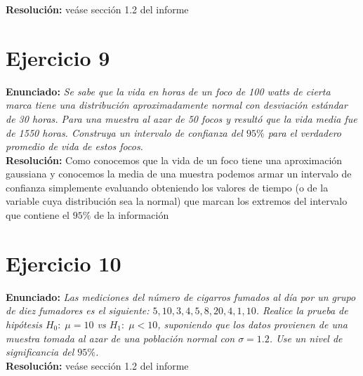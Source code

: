 \documentclass[twocolumn]{article}
\begin{document}
\textbf{Resolución:} veáse sección 1.2 del informe  

\section{Ejercicio 9}
\textbf{Enunciado:}
\textit{Se sabe que la vida en horas de un foco de 100 watts de cierta marca tiene una distribución aproximadamente normal con desviación estándar de 30 horas. Para una muestra al azar de 50 focos y resultó que la vida media fue de 1550 horas. Construya un intervalo de confianza del $95\%$ para el verdadero promedio de vida de estos focos.}\\

\textbf{Resolución:} Como conocemos que la vida de un foco tiene una aproximación gaussiana y conocemos la media de una muestra podemos armar un intervalo de confianza simplemente evaluando obteniendo los valores de tiempo (o de la variable cuya distribución sea la normal) que marcan los extremos del intervalo que contiene el $95\%$ de la información 

\section{Ejercicio 10}
\textbf{Enunciado:}
\textit{Las mediciones del número de cigarros fumados al día por un grupo de diez fumadores es el siguiente: $5, 10, 3, 4, 5, 8, 20, 4, 1, 10$. Realice la prueba de hipótesis $H_0 :\; \mu = 10 $ vs $H_1 :\; \mu < 10$, suponiendo que los datos provienen de una muestra tomada al azar de una población normal con $\sigma = 1.2$. Use un nivel de significancia del $95\%$.}\\

\textbf{Resolución:} veáse sección 1.2 del informe  
\end{document}
